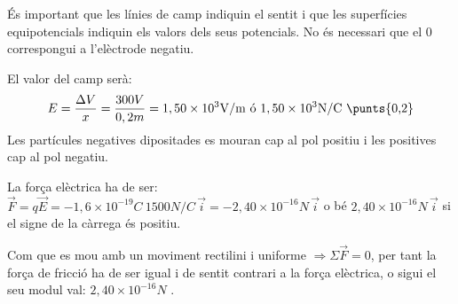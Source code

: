 \begin{solapartat}
És important que les línies de camp indiquin el sentit  i que les superfícies equipotencials indiquin els valors dels seus potencials.  No és necessari que el 0 correspongui a l'elèctrode negatiu.


El valor del camp serà:
\[ E = \frac{\Delta V}{x} = \frac{300V}{0,2m} = 1,50\times 10^{3}\mathrm{V/m}\ \text{ó}\ 1,50\times 10^{3}\mathrm{N/C} \ \text{\punts{0,2}} \]
Les partícules negatives dipositades es mouran cap al pol positiu i les positives cap al pol negatiu. 
\end{solapartat}

\begin{solapartat}
La força elèctrica ha de ser: $\overrightarrow{F} = q\overrightarrow{E} = -1,6\times 10^{-19}C\ 1500N/C\,\overrightarrow{i} = -2,40\times 10^{-16}N\,\overrightarrow{i}$ o bé $2,40\times 10^{-16}N\,\overrightarrow{i}$ si el signe de la càrrega és positiu. 

Com que es mou amb un moviment rectilini i uniforme $\Rightarrow \Sigma\overrightarrow{F} = 0$, per tant la força de fricció ha de ser igual i de sentit contrari a la força elèctrica, o sigui el seu modul val: $2,40\times 10^{-16}N$ .
\end{solapartat}
